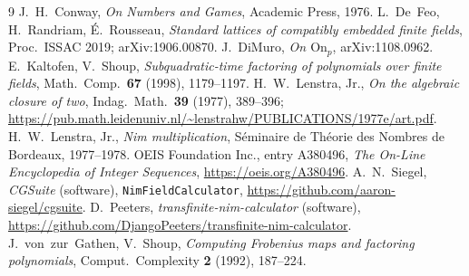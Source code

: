 \documentclass[11pt]{article}
\theoremstyle{plain}
\theoremstyle{definition}
\begin{document}
\begin{thebibliography}{9}
 J.~H.~Conway, \emph{On Numbers and Games}, Academic
Press, 1976.
 L.~De~Feo, H.~Randriam, \'E.~Rousseau, \emph{Standard
lattices of compatibly embedded finite fields}, Proc.\ ISSAC 2019;
arXiv:1906.00870.
 J.~DiMuro, \emph{On $\mathrm{On}_p$}, arXiv:1108.0962.
 E.~Kaltofen, V.~Shoup, \emph{Subquadratic-time factoring of
polynomials over finite fields}, Math.\ Comp.\ \textbf{67} (1998),
1179--1197.
 H.~W.~Lenstra, Jr., \emph{On the algebraic closure of
two}, Indag.\ Math.\ \textbf{39} (1977), 389--396;
\url{https://pub.math.leidenuniv.nl/~lenstrahw/PUBLICATIONS/1977e/art.pdf}.
 H.~W.~Lenstra, Jr., \emph{Nim multiplication},
S\'eminaire de Th\'eorie des Nombres de Bordeaux, 1977--1978.
 OEIS Foundation Inc., entry A380496,
\emph{The On-Line Encyclopedia of Integer Sequences},
\url{https://oeis.org/A380496}.
 A.~N.~Siegel, \emph{CGSuite} (software),
\texttt{NimFieldCalculator},
\url{https://github.com/aaron-siegel/cgsuite}.
 D.~Peeters, \emph{transfinite-nim-calculator}
(software),
\url{https://github.com/DjangoPeeters/transfinite-nim-calculator}.
 J.~von~zur~Gathen, V.~Shoup, \emph{Computing Frobenius
maps and factoring polynomials}, Comput.\ Complexity \textbf{2} (1992),
187--224.
\end{thebibliography}
\end{document}
